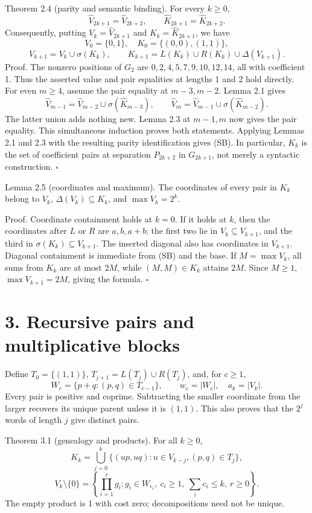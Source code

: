 \documentclass[11pt]{article}
\begin{document}
Theorem 2.4 (parity and semantic binding). For every \(k\ge0\),
\[
\widehat V_{2k+1}=\widehat V_{2k+2},\qquad
\widehat K_{2k+1}=\widehat K_{2k+2}.
\]
Consequently, putting \(V_k=\widehat V_{2k+1}\) and \(K_k=\widehat K_{2k+1}\), we have
\[
V_0=\{0,1\},\quad K_0=\{(0,0),(1,1)\},
\]
\[
V_{k+1}=V_k\cup\sigma(K_k),\qquad
K_{k+1}=L(K_k)\cup R(K_k)\cup\Delta(V_{k+1}).\tag{SB}
\]
Proof. The nonzero positions of \(G_2\) are \(0,2,4,5,7,9,10,12,14\), all with coefficient 1. Thus the asserted value and pair equalities at lengths 1 and 2 hold directly. For even \(m\ge4\), assume the pair equality at \(m-3,m-2\). Lemma 2.1 gives
\[
\widehat V_{m-1}=\widehat V_{m-2}\cup\sigma(\widehat K_{m-3}),\qquad
\widehat V_m=\widehat V_{m-1}\cup\sigma(\widehat K_{m-2}).
\]
The latter union adds nothing new. Lemma 2.3 at \(m-1,m\) now gives the pair equality. This simultaneous induction proves both statements. Applying Lemmas 2.1 and 2.3 with the resulting parity identification gives (SB). In particular, \(K_k\) is the set of coefficient pairs at separation \(P_{2k+2}\) in \(G_{2k+1}\), not merely a syntactic construction. \(\square\)

Lemma 2.5 (coordinates and maximum). The coordinates of every pair in \(K_k\) belong to \(V_k\), \(\Delta(V_k)\subseteq K_k\), and \(\max V_k=2^k\).

Proof. Coordinate containment holds at \(k=0\). If it holds at \(k\), then the coordinates after \(L\) or \(R\) are \(a,b,a+b\); the first two lie in \(V_k\subseteq V_{k+1}\), and the third in \(\sigma(K_k)\subseteq V_{k+1}\). The inserted diagonal also has coordinates in \(V_{k+1}\). Diagonal containment is immediate from (SB) and the base. If \(M=\max V_k\), all sums from \(K_k\) are at most \(2M\), while \((M,M)\in K_k\) attains \(2M\). Since \(M\ge1\), \(\max V_{k+1}=2M\), giving the formula. \(\square\)

\section*{3. Recursive pairs and multiplicative blocks}

Define \(T_0=\{(1,1)\}\), \(T_{j+1}=L(T_j)\cup R(T_j)\), and, for \(c\ge1\),
\[
W_c=\{p+q:(p,q)\in T_{c-1}\},\qquad w_c=|W_c|,\quad a_k=|V_k|.
\]
Every pair is positive and coprime. Subtracting the smaller coordinate from the larger recovers its unique parent unless it is \((1,1)\). This also proves that the \(2^j\) words of length \(j\) give distinct pairs.

Theorem 3.1 (genealogy and products). For all \(k\ge0\),
\[
K_k=\bigcup_{j=0}^k\{(up,uq):u\in V_{k-j},(p,q)\in T_j\},
\]
\[
V_k\setminus\{0\}=
\left\{\prod_{i=1}^r g_i:g_i\in W_{c_i},\ c_i\ge1,\ \sum_i c_i\le k,\ r\ge0\right\}.\tag{PR}
\]
The empty product is 1 with cost zero; decompositions need not be unique.
\end{document}
